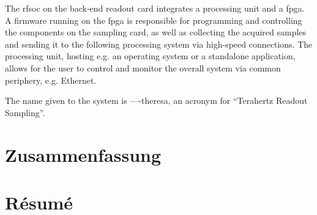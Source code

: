 The \gls{rfsoc} on the back-end readout card integrates a processing unit and a \gls{fpga}. 
A firmware running on the \gls{fpga} is responsible for programming and controlling the components on the sampling card, as well as collecting the acquired samples and sending it to the following processing system via high-speed connections.
The processing unit, hosting e.g. an operating system or a standalone application, allows for the user to control and monitor the overall system via common periphery, e.g. Ethernet.

The name given to the system is ----theresa, an acronym for ``Terahertz Readout Sampling''.
\chapter*{Zusammenfassung}
\chapter*{Résumé}